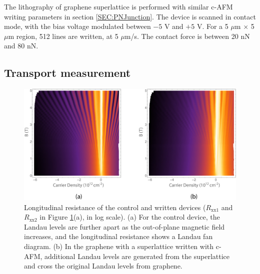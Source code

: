 \documentclass[pdflatex, sectionletters, 12pt]{pittetd}    %
\begin{document}
The lithography of graphene superlattice is performed with similar c-AFM writing parameters in section \ref{SEC:PNJunction}. The device is scanned in contact mode, with the bias voltage modulated between $-5$ V and $+5$ V. For a 5 $\mu$m $\times$ 5 $\mu$m region, 512 lines are written, at 5 $\mu$m/s. The contact force is between 20 nN and 80 nN.

\subsection{Transport measurement}

\begin{figure}[h!]
	\centering
	\includegraphics[width=1.0\textwidth]{Drawing/SuperlatticeControl.pdf}
	\caption{Longitudinal resistance of the control and written devices ($R_\mathrm{xx1}$ and $R_\mathrm{xx2}$ in Figure \ref{FIG:SuperlatticeControl}(a), in log scale). (a) For the control device, the Landau levels are further apart as the out-of-plane magnetic field increases, and the longitudinal resistance shows a Landau fan diagram. (b) In the graphene with a superlattice written with c-AFM, additional Landau levels are generated from the superlattice and cross the original Landau levels from graphene.}
	\label{FIG:SuperlatticeControl}
\end{figure}
\end{document}

